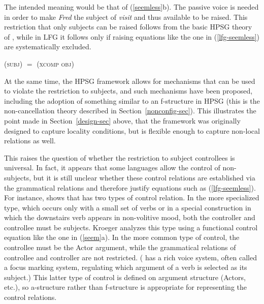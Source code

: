 \begin{exe} 
\ex 
\label{seemless}
\begin{xlist}
\end{xlist}
\end{exe}
\largerpage
The intended meaning would be that of (\ref{seemless}b).  The passive voice is needed in order to make \textit{Fred} the subject of \textit{visit} and thus available to be raised.  This restriction that only subjects can be raised follows from the basic HPSG theory of \citet[132-145]{ps2}, while in LFG it follows only if raising equations like the one in (\ref{lfg-seemless}) are systematically excluded.
\begin{exe} 
\ex 
\label{lfg-seemless}
 {(\up \textsc{subj})  $=$  (\up \textsc{xcomp} \textsc{obj})}
\end{exe}
At the same time, the HPSG framework allows for mechanisms that can be used to violate the restriction to subjects, and such mechanisms have been proposed, including the adoption of something similar to an f-structure in HPSG (this is the non-cancellation theory described in Section~\ref{nonconfig-sec}).  This illustrates the point made in Section~\ref{design-sec} above, that the framework was originally designed to capture locality conditions, but is flexible enough to capture non-local relations as well.  

This raises the question of whether the restriction to subject controllees is universal. In fact, it appears that some languages allow the control of non-subjects, but it is still unclear whether these control relations are established via the grammatical relations and therefore justify equations such as (\ref{lfg-seemless}).  For instance, \citet{kroeger:1993} shows that  has two types of control relation.  In the more specialized type, which occurs only with a small set of verbs or in a special construction in which the downstairs verb appears in non-volitive mood, both the controller and controllee must be subjects.  Kroeger analyzes this type using a functional control equation like the one in (\ref{seem}a).  In the more common type of  control, the controllee must be the Actor argument, while the grammatical relations of controllee and controller are not restricted.  ( has a rich voice system, often called a focus marking system, regulating which argument of a verb is selected as its subject.)  This latter type of  control is defined on argument structure (Actors, etc.), so a-structure rather than f-structure is appropriate for representing the control relations.

